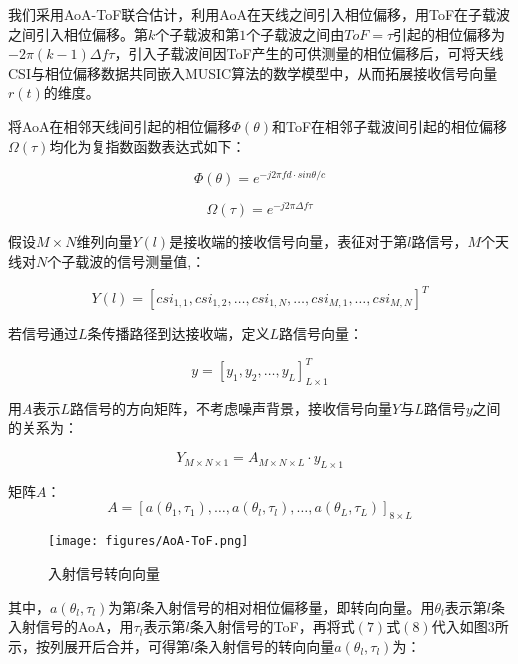 \documentclass[withoutpreface,bwprint]{cumcmthesis}
\begin{document}
我们采用AoA-ToF联合估计，利用AoA在天线之间引入相位偏移，用ToF在子载波之间引入相位偏移。第$k$个子载波和第$1$个子载波之间由$ToF=\tau$引起的相位偏移为$-2\pi(k-1)\Delta f\tau$，引入子载波间因ToF产生的可供测量的相位偏移后，可将天线CSI与相位偏移数据共同嵌入MUSIC算法的数学模型中，从而拓展接收信号向量$r(t)$的维度。

将AoA在相邻天线间引起的相位偏移$\Phi(\theta)$和ToF在相邻子载波间引起的相位偏移$\Omega(\tau)$均化为复指数函数表达式如下：

\begin{equation}
    \Phi(\theta)=e^{-j2\pi fd\cdot sin\theta/c}
\end{equation}

\vspace{-0.5cm}

\begin{equation}
    \Omega(\tau)=e^{-j2\pi \Delta f\tau}
\end{equation}

假设$M×N$维列向量$Y(l)$是接收端的接收信号向量，表征对于第$l$路信号，$M$个天线对$N$个子载波的信号测量值,：

\begin{equation}
    Y(l)=[csi_{1,1},csi_{1,2},\dots,csi_{1,N},\dots,csi_{M,1},\dots,csi_{M,N}]^{T}
\end{equation}

若信号通过$L$条传播路径到达接收端，定义$L$路信号向量：

\begin{equation}
    y=[y_1,y_2,\dots,y_{L}]^{T}_{L\times 1}
\end{equation}

用$A$表示$L$路信号的方向矩阵，不考虑噪声背景，接收信号向量$Y$与$L$路信号$y$之间的关系为：

\begin{equation}
    Y_{M×N\times1}=A_{M×N\times L}\cdot y_{L\times1}
\end{equation}

矩阵$A$：
\begin{equation}
    A=[a(\theta_1,\tau_1),\dots,a(\theta_l,\tau_l),\dots,a(\theta_L,\tau_L)]_{8\times L}
\end{equation}

\begin{figure}[h]
\caption{入射信号转向向量} \label{fig:aa}
\centering
\texttt{[image: figures/AoA-ToF.png]}
\end{figure}

其中，$a(\theta_{l},\tau_{l})$为第$l$条入射信号的相对相位偏移量，即转向向量。用$\theta_{l}$表示第$l$条入射信号的AoA，用$\tau_{l}$表示第$l$条入射信号的ToF，再将式$(7)$式$(8)$代入如图3所示，按列展开后合并，可得第$l$条入射信号的转向向量$a(\theta_{l},\tau_{l})$为：
\end{document}
